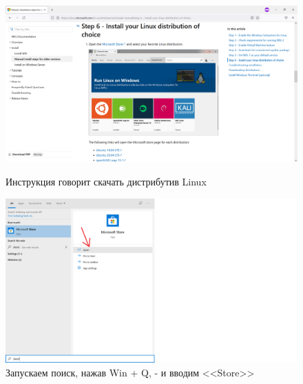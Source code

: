 \begin{figure}[!p]
    \centering
    \begin{minipage}{0.47\textwidth}
        \centering
        \includegraphics[width=\linewidth]
            {_assets/gpi_pz_docker_15.png}
        \caption{Инструкция говорит скачать дистрибутив Linux}
        \label{fig:gpi_pz_docker_15}
    \end{minipage}
    \begin{minipage}{0.47\textwidth}
        \centering
        \includegraphics[width=\linewidth]
            {_assets/gpi_pz_docker_16.png}
        \caption{Запускаем поиск, нажав Win + Q, - и вводим <<Store>>}
        \label{fig:gpi_pz_docker_16}
    \end{minipage}
\end{figure}

